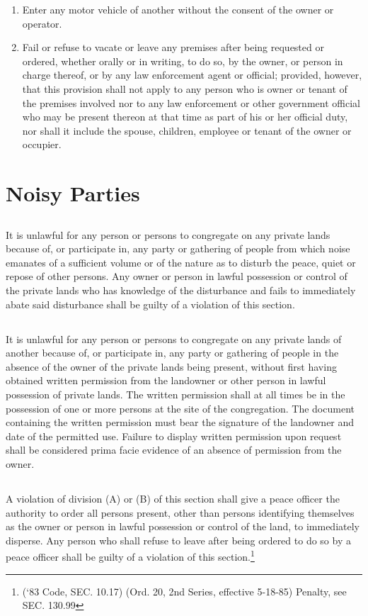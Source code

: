\begin{enumerate}[{\indent}A)]
    \item Enter any motor vehicle of another without the consent of the owner or operator.
    \item Fail or refuse to vacate or leave any premises after being requested or ordered, whether orally or in writing, to do so, by the owner, or person in charge thereof, or by any law enforcement agent or official; provided, however, that this provision shall not apply to any person who is owner or tenant of the premises involved nor to any law enforcement or other government official who may be present thereon at that time as part of his or her official duty, nor shall it include the spouse, children, employee or tenant of the owner or occupier.
\end{enumerate}
\section{Noisy Parties}
\subsection{}
It is unlawful for any person or persons to congregate on any private lands because of, or participate in, any party or gathering of people from which noise emanates of a sufficient volume or of the nature as to disturb the peace, quiet or repose of other persons. Any owner or person in lawful possession or control of the private lands who has knowledge of the disturbance and fails to immediately abate said disturbance shall be guilty of a violation of this section.
\subsection{}
It is unlawful for any person or persons to congregate on any private lands of another because of, or participate in, any party or gathering of people in the absence of the owner of the private lands being present, without first having obtained written permission from the landowner or other person in lawful possession of private lands. The written permission shall at all times be in the possession of one or more persons at the site of the congregation. The document containing the written permission must bear the signature of the landowner and date of the permitted use. Failure to display written permission upon request shall be considered prima facie evidence of an absence of permission from the owner.
\subsection{}
A violation of division (A) or (B) of this section shall give a peace officer the authority to order all persons present, other than persons identifying themselves as the owner or person in lawful possession or control of the land, to immediately disperse. Any person who shall refuse to leave after being ordered to do so by a peace officer shall be guilty of a violation of this section.\footnote{(‘83 Code, SEC. 10.17)  (Ord. 20, 2nd Series, effective 5-18-85)  Penalty, see SEC. 130.99}
